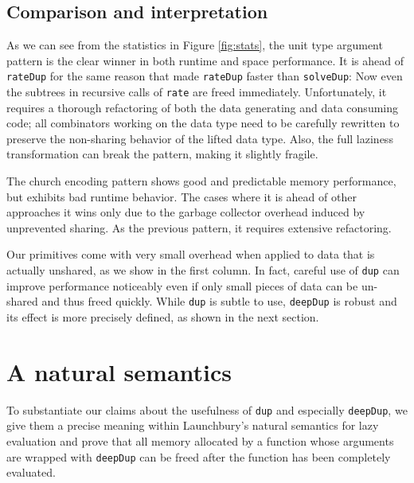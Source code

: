 \documentclass[preprint]{sigplanconf}
\theoremstyle{nonumberplain}
\newcommand{\li}{\lstinline[style=Haskell]}
\begin{document}
\subsection{Comparison and interpretation}

As we can see from the statistics in Figure \ref{fig:stats}, the unit type argument pattern is the clear winner in both runtime and space performance. It is ahead of \li-rateDup- for the same reason that made \li-rateDup- faster than \li-solveDup-: Now even the subtrees in recursive calls of \li-rate- are freed immediately.
Unfortunately, it requires a thorough refactoring of both the data generating and data consuming code; all combinators working on the data type need to be carefully rewritten to preserve the non-sharing behavior of the lifted data type. Also, the full laziness transformation can break the pattern, making it slightly fragile.

The church encoding pattern shows good and predictable memory performance, but exhibits bad runtime behavior. The cases where it is ahead of other approaches it wins only due to the garbage collector overhead induced by unprevented sharing. As the previous pattern, it requires extensive refactoring.

Our primitives come with very small overhead when applied to data that is actually unshared, as we show in the first column. In fact, careful use of \li-dup- can improve performance noticeably even if only small pieces of data can be un-shared and thus freed quickly. While \li-dup- is subtle to use, \li-deepDup- is robust and its effect is more precisely defined, as shown in the next section.

\section{A natural semantics}
\label{sec:semantics}

To substantiate our claims about the usefulness of \li-dup- and especially \li-deepDup-, we give them a precise meaning within Launchbury’s natural semantics for lazy evaluation \citep{launchbury} and prove that all memory allocated by a function whose arguments are wrapped with \li-deepDup- can be freed after the function has been completely evaluated.
\end{document}
